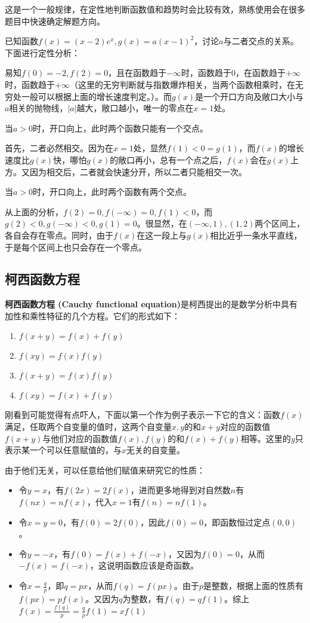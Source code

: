 {这是一个一般规律，在定性地判断函数值和趋势时会比较有效，熟练使用会在很多题目中快速确定解题方向。

\begin{example}{已知函数$f(x)=(x-2)e^x,g(x)=a(x-1)^2$，讨论$a$与二者交点的关系。}
下面进行定性分析：

易知$f(0)=-2,f(2)=0$，且在函数趋于$-\infty$时，函数趋于$0$，在函数趋于$+\infty$时，函数趋于$+\infty$（这里的无穷判断就与指数爆炸相关，当两个函数相乘时，在无穷处一般可以根据上面的增长速度判定。）。而$g(x)$是一个开口方向及敞口大小与$a$相关的抛物线，$|a|$越大，敞口越小，唯一的零点在$x=1$处。

当$a>0$时，开口向上，此时两个函数只能有一个交点。

首先，二者必然相交。因为在$x=1$处，显然$f(1)<0=g(1)$，而$f(x)$的增长速度比$g(x)$快，哪怕$g(x)$的敞口再小，总有一个点之后，$f(x)$会在$g(x)$上方。又因为相交后，二者就会快速分开，所以二者只能相交一次。

当$a>0$时，开口向上，此时两个函数有两个交点。

从上面的分析，$f(2)=0,f(-\infty)=0,f(1)<0$，而$g(2)<0,g(-\infty)<0,g(1)=0$。很显然，在$(-\infty,1),(1,2)$两个区间上，各自会存在零点。同时，由于$f(x)$在这一段上与$g(x)$相比近乎一条水平直线，于是每个区间上也只会存在一个零点。

\end{example}

\subsection{柯西函数方程}

\textbf{柯西函数方程 (Cauchy functional equation)}是柯西提出的是数学分析中具有加性和乘性特征的几个方程。它们的形式如下：
\begin{enumerate}
\item $f(x+y)=f(x)+f(y)$
\item $f(xy) = f(x) f(y)$
\item $f(x+y)=f(x)f(y)$
\item $f(xy) = f(x)+f(y)$
\end{enumerate}

刚看到可能觉得有点吓人，下面以第一个作为例子表示一下它的含义：函数$f(x)$满足，任取两个自变量的值时，这两个自变量$x,y$的和$x+y$对应的函数值$f(x+y)$与他们对应的函数值$f(x),f(y)$的和$f(x)+f(y)$相等。这里的$y$只表示某一个可以任意赋值的，与$x$无关的自变量。

由于他们无关，可以任意给他们赋值来研究它的性质：
\begin{itemize}
\item 令$y=x$，有$f(2x)=2f(x)$，进而更多地得到对自然数$n$有$f(nx)=nf(x)$，代入$x=1$有$f(n)=nf(1)$。
\item 令$x=y=0$，有$f(0)=2f(0)$，因此$f(0)=0$，即函数恒过定点$(0,0)$。
\item 令$y=-x$，有$f(0)=f(x)+f(-x)$，又因为$f(0)=0$，从而$-f(x)=f(-x)$，这说明函数应该是奇函数。
\item 令$\displaystyle x=\frac{q}{p}$，即$q=px$，从而$f(q)=f(px)$。由于$p$是整数，根据上面的性质有$f(px)=pf(x)$。又因为$q$为整数，有$f(q)=qf(1)$。综上$\displaystyle f(x)=\frac{f(q)}{p}=\frac{q}{p}f(1)=xf(1)$
\end{itemize}

}
